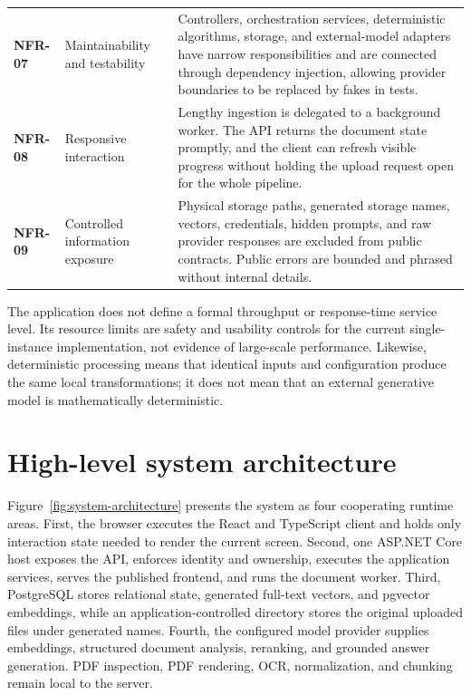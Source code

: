 {\begin{longtable}{@{}L{1.2cm}L{5.2cm}L{7.3cm}@{}}
\textbf{NFR-07} &
Maintainability and testability &
Controllers, orchestration services, deterministic algorithms, storage, and
external-model adapters have narrow responsibilities and are connected through
dependency injection, allowing provider boundaries to be replaced by fakes in
tests. \\

\textbf{NFR-08} &
Responsive interaction &
Lengthy ingestion is delegated to a background worker. The API returns the
document state promptly, and the client can refresh visible progress without
holding the upload request open for the whole pipeline. \\

\textbf{NFR-09} &
Controlled information exposure &
Physical storage paths, generated storage names, vectors, credentials, hidden
prompts, and raw provider responses are excluded from public contracts. Public
errors are bounded and phrased without internal details. \\
\end{longtable}
}

The application does not define a formal throughput or response-time service
level. Its resource limits are safety and usability controls for the current
single-instance implementation, not evidence of large-scale performance.
Likewise, deterministic processing means that identical inputs and
configuration produce the same local transformations; it does not mean that an
external generative model is mathematically deterministic.

\section{High-level system architecture}
\label{sec:high-level-architecture}

Figure~\ref{fig:system-architecture} presents the system as four cooperating
runtime areas. First, the browser executes the React and TypeScript client and
holds only interaction state needed to render the current screen. Second, one
ASP.NET Core host exposes the API, enforces identity and ownership, executes the
application services, serves the published frontend, and runs the document
worker. Third, PostgreSQL stores relational state, generated full-text vectors,
and pgvector embeddings, while an application-controlled directory stores the
original uploaded files under generated names. Fourth, the configured model
provider supplies embeddings, structured document analysis, reranking, and
grounded answer generation. PDF inspection, PDF rendering, OCR, normalization,
and chunking remain local to the server.

